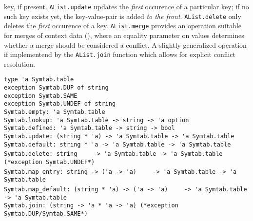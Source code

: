 \begin{isabellebody}
\begin{isamarkuptext}
  key, if present.  \verb|AList.update| updates
  the \emph{first} occurence of a particular key; if no such
  key exists yet, the key-value-pair is added \emph{to the front}.
  \verb|AList.delete| only deletes the \emph{first} occurence of a key.
  \verb|AList.merge| provides an operation suitable for merges of context data
  (), where an equality parameter on
  values determines whether a merge should be considered a conflict.
  A slightly generalized operation if implementend by the \verb|AList.join|
  function which allows for explicit conflict resolution.%
\end{isamarkuptext}%
\isamarkuptrue%
%
\isamarkuptrue%
%
\begin{isamarkuptext}%
\begin{mldecls}
  \verb|type 'a Symtab.table| \\
  \verb|exception Symtab.DUP of string| \\
  \verb|exception Symtab.SAME| \\
  \verb|exception Symtab.UNDEF of string| \\
  \verb|Symtab.empty: 'a Symtab.table| \\
  \verb|Symtab.lookup: 'a Symtab.table -> string -> 'a option| \\
  \verb|Symtab.defined: 'a Symtab.table -> string -> bool| \\
  \verb|Symtab.update: (string * 'a) -> 'a Symtab.table -> 'a Symtab.table| \\
  \verb|Symtab.default: string * 'a -> 'a Symtab.table -> 'a Symtab.table| \\
  \verb|Symtab.delete: string|\isasep\isanewline%
\verb|    -> 'a Symtab.table -> 'a Symtab.table (*exception Symtab.UNDEF*)| \\
  \verb|Symtab.map_entry: string -> ('a -> 'a)|\isasep\isanewline%
\verb|    -> 'a Symtab.table -> 'a Symtab.table| \\
  \verb|Symtab.map_default: (string * 'a) -> ('a -> 'a)|\isasep\isanewline%
\verb|    -> 'a Symtab.table -> 'a Symtab.table| \\
  \verb|Symtab.join: (string -> 'a * 'a -> 'a) (*exception Symtab.DUP/Symtab.SAME*)|\isasep\isanewline%

\end{mldecls}
\end{isamarkuptext}
\end{isabellebody}
